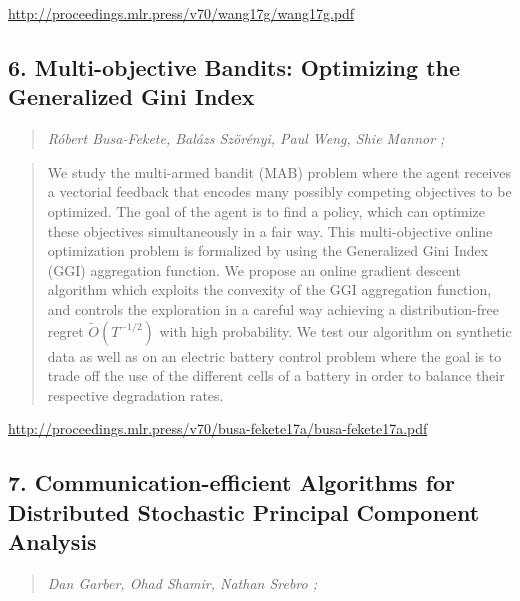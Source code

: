 \documentclass{article}
\begin{document}
\href{http://proceedings.mlr.press/v70/wang17g/wang17g.pdf}{http://proceedings.mlr.press/v70/wang17g/wang17g.pdf}

\subsection{6. Multi-objective Bandits: Optimizing the Generalized Gini Index}

\begin{quote}
\footnotesize{\textit{Róbert Busa-Fekete, Balázs Szörényi, Paul Weng, Shie Mannor ;}}

\end{quote}

\begin{quote}
    We study the multi-armed bandit (MAB) problem where the agent receives a vectorial feedback that encodes many possibly competing objectives to be optimized. The goal of the agent is to find a policy, which can optimize these objectives simultaneously in a fair way. This multi-objective online optimization problem is formalized by using the Generalized Gini Index (GGI) aggregation function. We propose an online gradient descent algorithm which exploits the convexity of the GGI aggregation function, and controls the exploration in a careful way achieving a distribution-free regret $\tilde{O}(T^{-1/2} )$ with high probability. We test our algorithm on synthetic data as well as on an electric battery control problem where the goal is to trade off the use of the different cells of a battery in order to balance their respective degradation rates.  
\end{quote}

\href{http://proceedings.mlr.press/v70/busa-fekete17a/busa-fekete17a.pdf}{http://proceedings.mlr.press/v70/busa-fekete17a/busa-fekete17a.pdf}

\subsection{7. Communication-efficient Algorithms for Distributed Stochastic Principal Component Analysis}

\begin{quote}
\footnotesize{\textit{Dan Garber, Ohad Shamir, Nathan Srebro ;}}

\end{quote}
\end{document}
